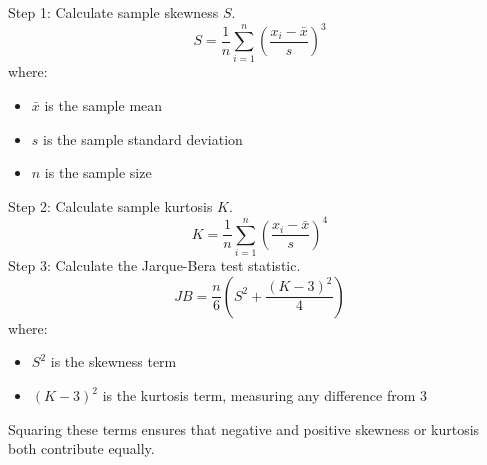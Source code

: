 \documentclass[preview]{standalone}
\begin{document}
Step 1: Calculate sample skewness $S$.
{\Large
\[
S=\frac{1}{n}\sum^n_{i=1} \left(\frac{x_i-\bar{x}}{s}\right)^3
\]
}
where:
\begin{itemize}
	\setlength\itemsep{0.1em}
	\item $\bar{x}$ is the sample mean
	\item $s$ is the sample standard deviation
	\item $n$ is the sample size
\end{itemize}
Step 2: Calculate sample kurtosis $K$.
{\Large
\[
K=\frac{1}{n}\sum^n_{i=1} \left(\frac{x_i-\bar{x}}{s}\right)^4
\]
}
Step 3: Calculate the Jarque-Bera test statistic.
{\Large
\[
JB=\frac{n}{6}\left(S^2+\frac{(K-3)^2}{4}\right)
\]
}
where:
\begin{itemize}
	\setlength\itemsep{0.1em}
	\item $S^2$ is the skewness term
	\item $(K-3)^2$ is the kurtosis term, measuring any difference from 3
\end{itemize}
Squaring these terms ensures that negative and positive skewness or kurtosis both contribute equally.
\end{document}
